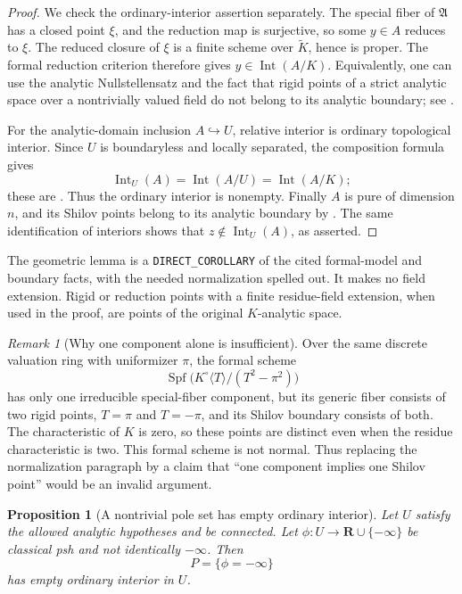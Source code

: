 \documentclass[11pt,a4paper]{article}
\numberwithin{equation}{section}
\newtheorem{proposition}[theorem]{Proposition}
\theoremstyle{definition}
\theoremstyle{remark}
\newtheorem{remark}[theorem]{Remark}
\begin{document}
\begin{proof}
We check the ordinary-interior assertion separately. The special
fiber of $\mathfrak A$ has a closed point $\xi$, and the reduction
map is surjective, so some $y\in A$ reduces to $\xi$. The reduced
closure of $\xi$ is a finite scheme over $\widetilde K$, hence is
proper. The formal reduction criterion
\cite[Lemma~6.5.1, p.~105]{CLD12} therefore gives
$y\in\operatorname{Int}(A/K)$. Equivalently, one can use the
analytic Nullstellensatz and the fact that rigid points of a strict
analytic space over a nontrivially valued field do not belong to its
analytic boundary; see \cite[Remark~4.3.9, p.~67]{CLD12}.

For the analytic-domain inclusion $A\hookrightarrow U$, relative
interior is ordinary topological interior. Since $U$ is boundaryless
and locally separated, the composition formula gives
\[
 \operatorname{Int}_U(A)
   =\operatorname{Int}(A/U)=\operatorname{Int}(A/K);
\]
these are \cite[\S2.11(3)--(4), pp.~7--8]{GR25}. Thus the ordinary
interior is nonempty. Finally $A$ is pure of dimension $n$, and its
Shilov points belong to its analytic boundary by
\cite[Lemma~6.2, p.~31]{GR25}. The same identification of interiors
shows that $z\notin\operatorname{Int}_U(A)$, as asserted.
\end{proof}

The geometric lemma is a \texttt{DIRECT\_COROLLARY} of the cited
formal-model and boundary facts, with the needed normalization
spelled out. It makes no field extension. Rigid or reduction points
with a finite residue-field extension, when used in the proof, are
points of the original $K$-analytic space.

\begin{remark}[Why one component alone is insufficient]
Over the same discrete valuation ring with uniformizer $\pi$, the
formal scheme
\[
 \operatorname{Spf}\bigl(K^\circ\langle T\rangle/(T^2-\pi^2)\bigr)
\]
has only one irreducible special-fiber component, but its generic
fiber consists of two rigid points, $T=\pi$ and $T=-\pi$, and its
Shilov boundary consists of both. The characteristic of $K$ is zero,
so these points are distinct even when the residue characteristic is
two. This formal scheme is not normal. Thus replacing the
normalization paragraph by a claim that ``one component implies one
Shilov point'' would be an invalid argument.
\end{remark}

\begin{proposition}[A nontrivial pole set has empty ordinary interior]
\label{prop:r2-no-interior-poles}
Let $U$ satisfy the allowed analytic hypotheses and be connected.
Let $\phi:U\to\mathbf R\cup\{-\infty\}$ be classical psh and not
identically $-\infty$. Then
\[
 P=\{\phi=-\infty\}
\]
has empty ordinary interior in $U$.
\end{proposition}
\end{document}
